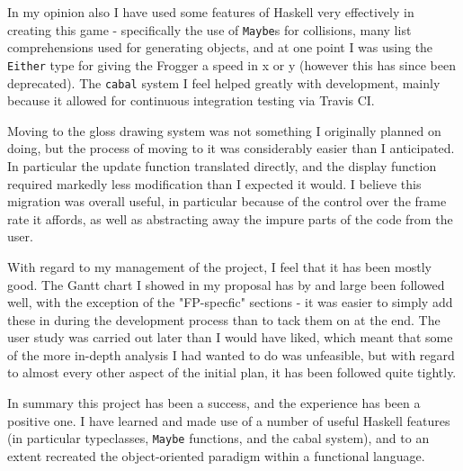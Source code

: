 \documentclass[12pt, a4paper]{report}
\begin{document}
\par

In my opinion also I have used some features of Haskell very effectively in creating this game - specifically the use of \verb|Maybe|s for collisions, many list comprehensions used for generating objects, and at one point I was using the \verb|Either| type for giving the Frogger a speed in x or y (however this has since been deprecated).
The \verb|cabal| system I feel helped greatly with development, mainly because it allowed for continuous integration testing via Travis CI.

\par

Moving to the gloss drawing system was not something I originally planned on doing, but the process of moving to it was considerably easier than I anticipated.
In particular the update function translated directly, and the display function required markedly less modification than I expected it would.
I believe this migration was overall useful, in particular because of the control over the frame rate it affords, as well as abstracting away the impure parts of the code from the user.

\par

With regard to my management of the project, I feel that it has been mostly good.
The Gantt chart I showed in my proposal has by and large been followed well, with the exception of the "FP-specfic" sections - it was easier to simply add these in during the development process than to tack them on at the end.
The user study was carried out later than I would have liked, which meant that some of the more in-depth analysis I had wanted to do was unfeasible, but with regard to almost every other aspect of the initial plan, it has been followed quite tightly.

\par

In summary this project has been a success, and the experience has been a positive one.
I have learned and made use of a number of useful Haskell features (in particular typeclasses, \verb|Maybe| functions, and the cabal system), and to an extent recreated the object-oriented paradigm within a functional language.
\end{document}
